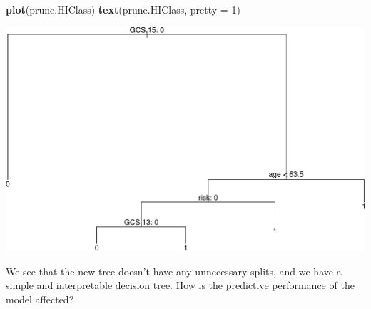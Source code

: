 \documentclass[ignorenonframetext,]{beamer}
\newenvironment{Shaded}{\begin{snugshade}}{\end{snugshade}}
\newcommand{\KeywordTok}[1]{\textcolor[rgb]{0.13,0.29,0.53}{\textbf{#1}}}
\newcommand{\DataTypeTok}[1]{\textcolor[rgb]{0.13,0.29,0.53}{#1}}
\newcommand{\DecValTok}[1]{\textcolor[rgb]{0.00,0.00,0.81}{#1}}
\newcommand{\NormalTok}[1]{#1}
\begin{document}
\begin{frame}[fragile]

\begin{Shaded}
\begin{Highlighting}[]
\KeywordTok{plot}\NormalTok{(prune.HIClass)}
\KeywordTok{text}\NormalTok{(prune.HIClass, }\DataTypeTok{pretty =} \DecValTok{1}\NormalTok{)}
\end{Highlighting}
\end{Shaded}

\includegraphics{8TreesBEAMER_files/figure-beamer/unnamed-chunk-21-1.pdf}

We see that the new tree doesn't have any unnecessary splits, and we
have a simple and interpretable decision tree. How is the predictive
performance of the model affected?

\end{frame}
\end{document}
